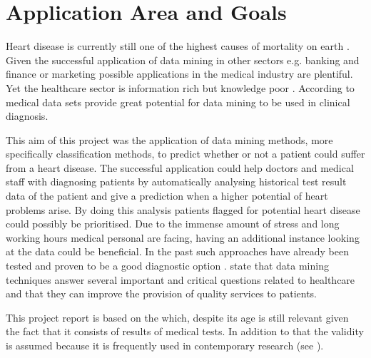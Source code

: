 \chapter{Application Area and Goals}

Heart disease is currently still one of the highest causes of mortality on earth \citep{nahar2013, kavitha2016, statistischesbundesamt2020}.
Given the successful application of data mining in other sectors e.g. banking and finance or marketing \citep{keles2017} possible applications in the medical industry are plentiful. Yet the healthcare sector is information rich but knowledge poor \citep{soni2011}. According to \citet{soni2011} medical data sets provide great potential for data mining to be used in clinical diagnosis.


This aim of this project was the application of data mining methods, more specifically classification methods, to predict whether or not a patient could suffer from a heart disease. The successful application could help doctors and medical staff with diagnosing patients by automatically analysing historical test result data of the patient and give a prediction when a higher potential of heart problems arise. By doing this analysis patients flagged for potential heart disease could possibly be prioritised. Due to the immense amount of stress and long working hours medical personal are facing, having an additional instance looking at the data could be beneficial. 
In the past such approaches have already been tested and proven to be a good diagnostic option \citep{usharani2011}. \citet{jabbar2013} state that data mining techniques answer several important and critical questions related to healthcare and that they can improve the provision of quality services to patients.

This project report is based on the  \citep{janosi1988} which, despite its age is still relevant given the fact that it consists of results of medical tests. In addition to that the validity is assumed because it is frequently used in contemporary research (see \cite{usharani2011, aha1988, nahar2013}).





\newpage

